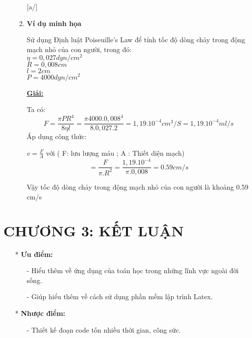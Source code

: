 \documentclass[12pt,a4paper]{article}
\begin{document}
\begin{enumerate}[a/]
\begin{enumerate} [a/]
\begin{flushleft}
            \end{flushleft}
            \item \textbf{Ví dụ minh họa}
            \begin{flushleft}
                Sử dụng Định luật Poiseuille’s Law để tính tốc độ dòng chảy trong động mạch nhỏ của con người, trong đó: 
                \\
                $\eta = 0,027 dyn/cm^2$
                \\
                $R= 0,008 cm$
                \\
                $l= 2 cm$
                \\
                $P= 4000 dyn/cm^2$
            \end{flushleft}
            \begin{center}
                \textbf{\underline{Giải:}}
            \end{center}
            \begin{flushleft}
                Ta có: 
                $$F=\frac{\pi PR^4}{8\eta l}=\frac{\pi 4000.0,008^4}{8.0,027.2}=1,19.10^{-4} cm^3/S=1,19.10^{-4} ml/s$$
                Áp dụng công thức:
            \end{flushleft}
                \begin{center}
                    $v=\frac{F}{A}$ với ( F: lưu lượng máu ; A : Thiết diện mạch)
                    $$=\frac{F}{\pi.R^2}=\frac{1,19.10^{-4}}{\pi . 0,008}=0.59 cm/s$$
                \end{center}
            \begin{flushleft}
                Vậy tốc độ dòng chảy trong động mạch nhỏ của con người là khoảng 0.59 cm/s
            \end{flushleft}    

        \end{enumerate}
\end{enumerate}

\newpage
{}
\section*{CHƯƠNG 3: KẾT LUẬN}
\begin{itemize}
	\item[*] \textbf{Ưu điểm:}
	      \begin{itemize}
		      \item[-] Hiểu thêm về ứng dụng của toán học trong những lĩnh vực ngoài đời sống.
		      \item[-] Giúp hiểu thêm về cách sử dụng phần mềm lập trình Latex.
	      \end{itemize}
	\item[*] \textbf{Nhược điểm:}
	      \begin{itemize}
		      \item[-] Thiết kế đoạn code tốn nhiều thời gian, công sức.
	      \end{itemize}
\end{itemize}
\end{document}

